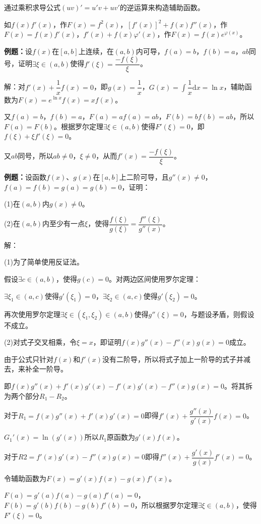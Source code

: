 \documentclass[UTF8, 12pt]{ctexart}
\begin{document}
通过乘积求导公式$(uv)'=u'v+uv'$的逆运算来构造辅助函数。

如$f(x)f'(x)$，作$F(x)=f^2(x)$，$[f'(x)]^2+f(x)f''(x)$，作$F(x)=f(x)f'(x)$，$f'(x)+f(x)\varphi'(x)$，作$F(x)=f(x)e^{\varphi(x)}$。

\textbf{例题：}设$f(x)$在$[a,b]$上连续，在$(a,b)$内可导，$f(a)=b$，$f(b)=a$，$ab$同号，证明$\exists\xi\in(a,b)$使得$f'(\xi)=\dfrac{-f(\xi)}{\xi}$。

解：对$f'(x)+\dfrac{1}{x}f(x)=0$，即$g(x)=\dfrac{1}{x}$，$G(x)=\int\dfrac{1}{x}\textrm{d}x=\ln x$，辅助函数为$F(x)=e^{\ln x}f(x)=xf(x)$。

又$f(a)=b$，$f(b)=a$，$F(a)=af(a)=ab$，$F(b)=bf(b)=ab$，所以$F(a)=F(b)$。根据罗尔定理$\exists\xi\in(a,b)$使得$F'(\xi)=0$，即$f(\xi)+\xi f'(\xi)=0$。

又$ab$同号，所以$ab\neq0$，$\xi\neq0$，从而$f'(x)=\dfrac{-f(\xi)}{\xi}$。

\textbf{例题：}设函数$f(x)$、$g(x)$在$[a,b]$上二阶可导，且$g''(x)\neq0$，$f(a)=f(b)=g(a)=g(b)=0$，证明：

(1)在$(a,b)$内$g(x)\neq0$。

(2)在$(a,b)$内至少有一点$\xi$，使得$\dfrac{f(\xi)}{g(\xi)}=\dfrac{f''(\xi)}{g''(x)}$。

解：

(1)为了简单使用反证法。

假设$\exists c\in(a,b)$，使得$g(c)=0$。对两边区间使用罗尔定理：

$\exists\xi_1\in(a,c)$使得$g'(\xi_1)=0$，$\exists\xi_2\in(a,c)$使得$g'(\xi_2)=0$。

再次使用罗尔定理$\exists\xi\in(\xi_1,\xi_2)\in(a,b)$使得$g''(\xi)=0$，与题设矛盾，则假设不成立。

(2)对式子交叉相乘，令$\xi=x$，即证明$f(x)g''(x)-f''(x)g(x)=0$成立。

由于公式只针对$f(x)$和$f'(x)$没有二阶导，所以将式子加上一阶导的式子并减去，来补全一阶导。

即$f(x)g''(x)+f'(x)g'(x)-f'(x)g'(x)-f''(x)g(x)=0$。将其拆为两个部分$R_1-R_2$。

对于$R_1=f(x)g''(x)+f'(x)g'(x)=0$即得$f'(x)+\dfrac{g''(x)}{g'(x)}f(x)=0$。

$G_1'(x)=\ln(g'(x))$所以$R_1$原函数为$g'(x)f(x)$。

对于$R2=f'(x)g'(x)-f''(x)g(x)=0$即得$f''(x)+\dfrac{g'(x)}{g(x)}f'(x)=0$。

令辅助函数为$F(x)=g'(x)f(x)-g(x)f'(x)$。

$F(a)=g'(a)f(a)-g(a)f'(a)=0$，$F(b)=g'(b)f(b)-g(b)f'(b)=0$，所以根据罗尔定理$\exists\xi\in(a,b)$，使得$F'(\xi)=0$。
\end{document}
